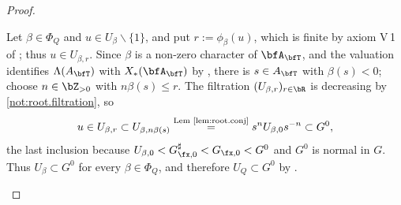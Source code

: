 \documentclass[12pt,a4paper]{amsart}%
\begin{document}
\begin{proof}
\begin{enumerate}[Step 1.]
{Let $\beta\in\Phi_Q$ and $u\in U_\beta\smallsetminus\{1\}$, and put $r:=\phi_\beta(u)$,
which is finite by axiom V\,1 of \cite[Definition 6.1.2]{KP}; thus $u\in U_{\beta,r}$. Since
$\beta$ is a non-zero character of $\bfA_\bfT$, and the valuation identifies $\Lambda(A_\bfT)$
with $X_*(\bfA_\bfT)$ by \cite[V.2.6]{Ren}, there is $s\in A_\bfT$ with $\beta(s)<0$; choose
$n\in\Z_{>0}$ with $n\beta(s)\leq r$. The filtration $(U_{\beta,r})_{r\in\R}$ is decreasing
by \eqref{not:root.filtration}, so
$$
u\in U_{\beta,r}\subset U_{\beta,n\beta(s)}
\overset{\text{Lem \ref{lem:root.conj}}}{=}s^nU_{\beta,0}s^{-n}\subset G^0 ,
$$
the last inclusion because $U_{\beta,0}<G^\sharp_{\fx,0}<G_{\fx,0}<G^0$ and $G^0$ is normal
in $G$. Thus $U_\beta\subset G^0$ for every $\beta\in\Phi_Q$, and therefore $U_Q\subset G^0$
by .
}
\end{enumerate}
\end{proof}
\end{document}
